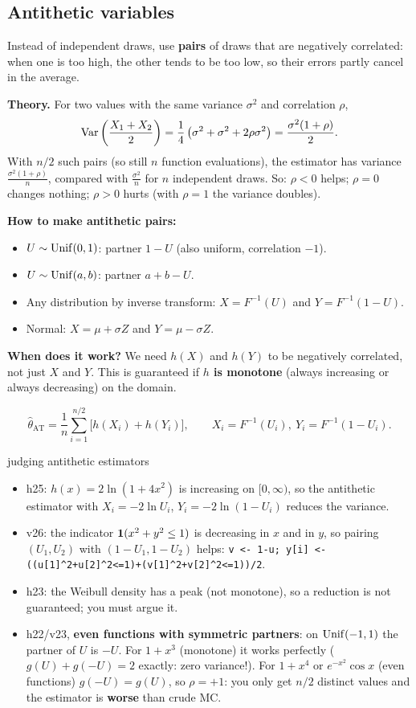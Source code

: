 \subsection{Antithetic variables}
\begin{idea}
Instead of independent draws, use \textbf{pairs} of draws that are negatively correlated: when one is too high, the other tends to be too low, so their errors partly cancel in the average.
\end{idea}

\textbf{Theory.} For two values with the same variance $\sigma^2$ and correlation $\rho$,
\[
\mathrm{Var}\left(\frac{X_1+X_2}{2}\right) = \frac14\left(\sigma^2+\sigma^2+2\rho\sigma^2\right) = \frac{\sigma^2(1+\rho)}{2}.
\]
With $n/2$ such pairs (so still $n$ function evaluations), the estimator has variance $\frac{\sigma^2(1+\rho)}{n}$, compared with $\frac{\sigma^2}{n}$ for $n$ independent draws. So: $\rho<0$ helps; $\rho=0$ changes nothing; $\rho>0$ hurts (with $\rho=1$ the variance doubles).

\textbf{How to make antithetic pairs:}
\begin{itemize}
  \item $U\sim\mathrm{Unif}(0,1)$: partner $1-U$ (also uniform, correlation $-1$).
  \item $U\sim\mathrm{Unif}(a,b)$: partner $a+b-U$.
  \item Any distribution by inverse transform: $X = F^{-1}(U)$ and $Y = F^{-1}(1-U)$.
  \item Normal: $X = \mu+\sigma Z$ and $Y = \mu-\sigma Z$.
\end{itemize}
\textbf{When does it work?} We need $h(X)$ and $h(Y)$ to be negatively correlated, not just $X$ and $Y$. This is guaranteed if \textbf{$h$ is monotone} (always increasing or always decreasing) on the domain.

\[
\hat\theta_{\text{AT}} = \frac1n\sum_{i=1}^{n/2}\big[h(X_i)+h(Y_i)\big],\qquad X_i = F^{-1}(U_i),\ Y_i = F^{-1}(1-U_i).
\]

\begin{example}{judging antithetic estimators}
\begin{itemize}
  \item h25: $h(x) = 2\ln(1+4x^2)$ is increasing on $[0,\infty)$, so the antithetic estimator with $X_i=-2\ln U_i$, $Y_i = -2\ln(1-U_i)$ reduces the variance.
  \item v26: the indicator $\mathbf{1}(x^2+y^2\le1)$ is decreasing in $x$ and in $y$, so pairing $(U_1,U_2)$ with $(1-U_1,1-U_2)$ helps: \texttt{v <- 1-u; y[i] <- ((u[1]\^{}2+u[2]\^{}2<=1)+(v[1]\^{}2+v[2]\^{}2<=1))/2}.
  \item h23: the Weibull density has a peak (not monotone), so a reduction is not guaranteed; you must argue it.
  \item h22/v23, \textbf{even functions with symmetric partners}: on $\mathrm{Unif}(-1,1)$ the partner of $U$ is $-U$. For $1+x^3$ (monotone) it works perfectly ($g(U)+g(-U)=2$ exactly: zero variance!). For $1+x^4$ or $e^{-x^2}\cos x$ (even functions) $g(-U) = g(U)$, so $\rho=+1$: you only get $n/2$ distinct values and the estimator is \textbf{worse} than crude MC.
\end{itemize}
\end{example}


